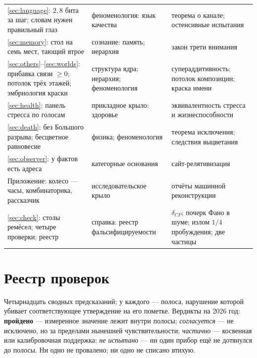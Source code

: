 \documentclass[11pt,letterpaper]{article}
\begin{document}
\begin{center}
\begin{tabular}{@{}p{}p{}p{}@{}}
\ref{sec:language}: $2{,}8$ бита за шаг; словам нужен правильный
глаз & феноменология: язык качества & теорема о канале; остенсивные
испытания \\[2pt]
\ref{sec:memory}: стол на семь мест, тающий втрое & сознание:
память; иерархия & закон трети внимания \\[2pt]
\ref{sec:others}--\ref{sec:worlds}: прибавка связи $\geq 0$;
потолок трёх этажей; эмбриология краски & структура ядра; иерархия;
феноменология & супераддитивность; потолок композиции; краска
имени \\[2pt]
\ref{sec:health}: панель стресса по голосам & прикладное крыло:
здоровье & эквивалентность стресса и жизнеспособности \\[2pt]
\ref{sec:death}: без Большого разрыва; бесцветное равновесие &
физика; феноменология & теорема исключения; следствия
выцветания \\[2pt]
\ref{sec:observer}: у фактов есть адреса & категорные основания &
сайт-релятивизация \\[2pt]
Приложение: колесо --- часы, комбинаторика,
рассказчик & исследовательское крыло & отчёты машинной
реконструкции \\[2pt]
\ref{sec:check}: столы ремёсел; четыре проверки; реестр & справка:
реестр фальсифицируемости & $\delta_{CP}$; почерк Фано в шуме;
излом $1/4$ пробуждения; две частицы \\
\bottomrule
\end{tabular}
\end{center}

\clearpage
\section*{Реестр проверок}

Четырнадцать сводных предсказаний; у каждого --- полоса, нарушение
которой убивает соответствующее утверждение на его пометке.
Вердикты на 2026 год: \textbf{пройдено} --- измеренное значение
лежит внутри полосы; \emph{согласуется} --- не исключено, но за
пределами нынешней чувствительности; \emph{частично} --- косвенная
или калибровочная поддержка; \emph{не испытано} --- ни один прибор
ещё не дотянулся до полосы. Ни одно не провалено; ни одно не
списано втихую.
\end{document}
